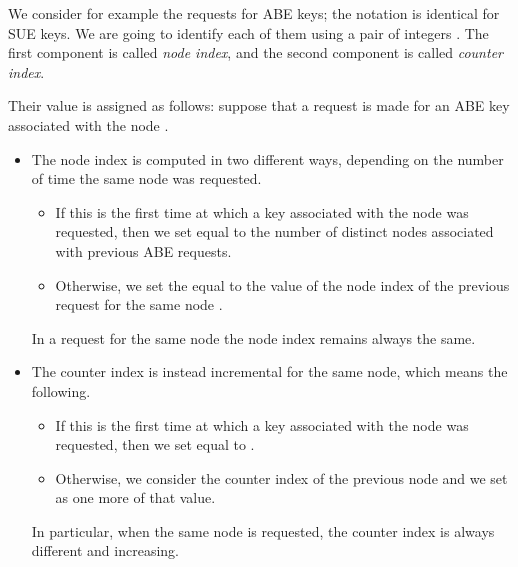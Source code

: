 \documentclass[a4paper,10pt]{article}
\begin{document}
	We consider for example the requests for ABE keys; the notation is identical for SUE keys. We are going to identify each of them using a pair of integers . The first component is called \emph{node index}, and the second component is called \emph{counter index}.
	
	Their value is assigned as follows: suppose that a request is made for an ABE key associated with the node .
	\begin{itemize}
		\item
		The node index  is computed in two different ways, depending on the number of time the same node was requested.
		\begin{itemize}
			\item
			If this is the first time at which a key associated with the node  was requested, then we set  equal to the number of distinct nodes associated with previous ABE requests.
			\item
			Otherwise, we set the  equal to the value of the node index of the previous request for the same node .
		\end{itemize}
		In a request for the same node the node index remains always the same.
		\item
		The counter index  is instead incremental for the same node, which means the following.
		\begin{itemize}
			\item
			If this is the first time at which a key associated with the node  was requested, then we set  equal to .
			\item
			Otherwise, we consider the counter index of the previous node and we set  as one more of that value.
		\end{itemize}
		In particular, when the same node is requested, the counter index is always different and increasing.
	\end{itemize}
	
\end{document}

